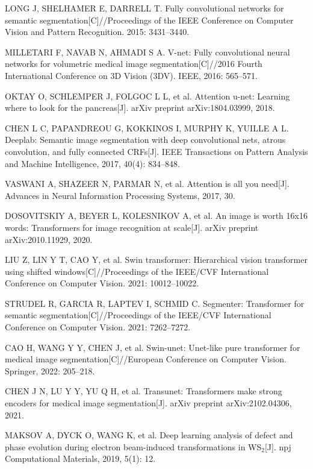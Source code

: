 LONG J, SHELHAMER E, DARRELL T. Fully convolutional networks for semantic segmentation[C]//Proceedings of the IEEE Conference on Computer Vision and Pattern Recognition. 2015: 3431--3440.

MILLETARI F, NAVAB N, AHMADI S A. V-net: Fully convolutional neural networks for volumetric medical image segmentation[C]//2016 Fourth International Conference on 3D Vision (3DV). IEEE, 2016: 565--571.

OKTAY O, SCHLEMPER J, FOLGOC L L, et al. Attention u-net: Learning where to look for the pancreas[J]. arXiv preprint arXiv:1804.03999, 2018.

CHEN L C, PAPANDREOU G, KOKKINOS I, MURPHY K, YUILLE A L. Deeplab: Semantic image segmentation with deep convolutional nets, atrous convolution, and fully connected CRFs[J]. IEEE Transactions on Pattern Analysis and Machine Intelligence, 2017, 40(4): 834--848.

VASWANI A, SHAZEER N, PARMAR N, et al. Attention is all you need[J]. Advances in Neural Information Processing Systems, 2017, 30.

DOSOVITSKIY A, BEYER L, KOLESNIKOV A, et al. An image is worth 16x16 words: Transformers for image recognition at scale[J]. arXiv preprint arXiv:2010.11929, 2020.

LIU Z, LIN Y T, CAO Y, et al. Swin transformer: Hierarchical vision transformer using shifted windows[C]//Proceedings of the IEEE/CVF International Conference on Computer Vision. 2021: 10012--10022.

STRUDEL R, GARCIA R, LAPTEV I, SCHMID C. Segmenter: Transformer for semantic segmentation[C]//Proceedings of the IEEE/CVF International Conference on Computer Vision. 2021: 7262--7272.

CAO H, WANG Y Y, CHEN J, et al. Swin-unet: Unet-like pure transformer for medical image segmentation[C]//European Conference on Computer Vision. Springer, 2022: 205--218.

CHEN J N, LU Y Y, YU Q H, et al. Transunet: Transformers make strong encoders for medical image segmentation[J]. arXiv preprint arXiv:2102.04306, 2021.

MAKSOV A, DYCK O, WANG K, et al. Deep learning analysis of defect and phase evolution during electron beam-induced transformations in WS$_2$[J]. npj Computational Materials, 2019, 5(1): 12.

